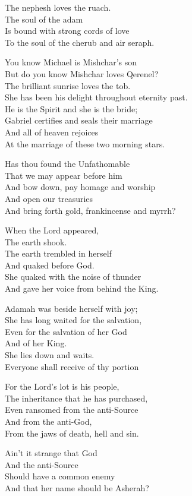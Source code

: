 \documentclass[
]{book}
\begin{document}
The nephesh loves the ruach.\\
The soul of the adam\\
Is bound with strong cords of love\\
To the soul of the cherub and air seraph.

You know Michael is Mishchar's son\\
But do you know Mishchar loves Qerenel?\\
The brilliant sunrise loves the tob.\\
She has been his delight throughout eternity past.\\
He is the Spirit and she is the bride;\\
Gabriel certifies and seals their marriage\\
And all of heaven rejoices\\
At the marriage of these two morning stars.

Has thou found the Unfathomable\\
That we may appear before him\\
And bow down, pay homage and worship\\
And open our treasuries\\
And bring forth gold, frankincense and myrrh?

When the Lord appeared,\\
The earth shook.\\
The earth trembled in herself\\
And quaked before God.\\
She quaked with the noise of thunder\\
And gave her voice from behind the King.

Adamah was beside herself with joy;\\
She has long waited for the salvation,\\
Even for the salvation of her God\\
And of her King.\\
She lies down and waits.\\
Everyone shall receive of thy portion

For the Lord's lot is his people,\\
The inheritance that he has purchased,\\
Even ransomed from the anti-Source\\
And from the anti-God,\\
From the jaws of death, hell and sin.

Ain't it strange that God\\
And the anti-Source\\
Should have a common enemy\\
And that her name should be Asherah?
\end{document}
